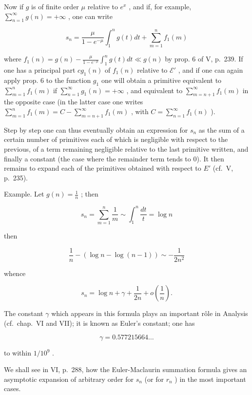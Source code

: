 Now if \(g\) is of finite order \(\mu\) relative to \(e^x\) , and if, for example, \(\sum_{n=1}^{\infty} g(n) = +\infty\) , one can write

\[
s _ {n} = \frac {\mu}{1 - e ^ {- \mu}} \int_ {1} ^ {n} g (t) d t + \sum_ {m = 1} ^ {n} f _ {1} (m)
\]

where \(f_{1}(n) = g(n) - \frac{\mu}{1 - e^{-\mu}}\int_{1}^{n}g(t)dt \ll g(n)\) by prop. 6 of V, p.~239. If one has a principal part \(cg_{1}(n)\) of \(f_{1}(n)\) relative to \(\mathcal{E}'\) , and if one can again apply prop. 6 to the function \(g_{1}\) one will obtain a primitive equivalent to \(\sum_{m=1}^{n}f_{1}(m)\) if \(\sum_{n=1}^{\infty}g_{1}(n) = +\infty\) , and equivalent to \(\sum_{m=n+1}^{\infty}f_{1}(m)\) in the opposite case (in the latter case one writes \(\sum_{m=1}^{n}f_{1}(m) = C - \sum_{m=n+1}^{\infty}f_{1}(m)\) , with \(C = \sum_{n=1}^{\infty}f_{1}(n)\) ).

Step by step one can thus eventually obtain an expression for \(s_{n}\) as the sum of a certain number of primitives each of which is negligible with respect to the previous, of a term remaining negligible relative to the last primitive written, and finally a constant (the case where the remainder term tends to 0). It then remains to expand each of the primitives obtained with respect to \(E'\) (cf.~V, p.~235).

Example. Let \(g(n) = \frac{1}{n}\) ; then

\[
s _ {n} = \sum_ {m = 1} ^ {n} \frac {1}{m} \sim \int_ {1} ^ {n} \frac {d t}{t} = \log n
\]

then

\[
\frac {1}{n} - (\log n - \log (n - 1)) \sim - \frac {1}{2 n ^ {2}}
\]

whence

\[
s _ {n} = \log n + \gamma + \frac {1}{2 n} + o \left(\frac {1}{n}\right).
\]

The constant \(\gamma\) which appears in this formula plays an important rôle in Analysis (cf.~chap.~VI and VII); it is known as Euler's constant; one has

\[
\gamma = 0. 5 7 7   2 1 5   6 6 4 \dots
\]

to within \(1/10^{9}\) .

We shall see in VI, p.~288, how the Euler-Maclaurin summation formula gives an asymptotic expansion of arbitrary order for \(s_n\) (or for \(r_n\) ) in the most important cases.

